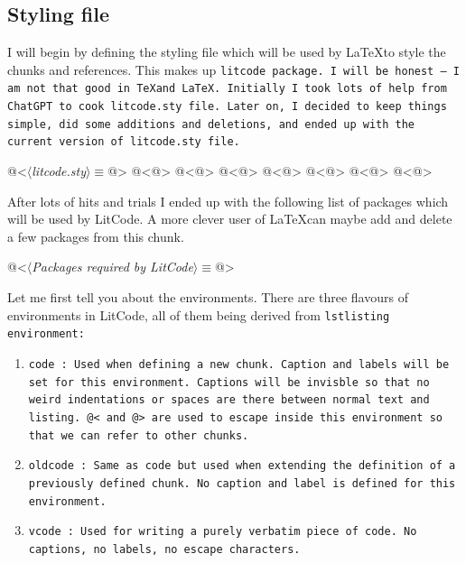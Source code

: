 \subsection{Styling file}

I will begin by defining the styling file which will be used by \LaTeX to style the chunks and references.
This makes up \tt litcode \rm package. I will be honest --- I am not that good in \TeX and \LaTeX. Initially I
took lots of help from ChatGPT to cook \tt litcode.sty \rm file. Later on, I decided to keep things simple,
did some additions and deletions, and ended up with the current version of \tt litcode.sty \rm file.

\begin{code}
@<$\langle$\textit{litcode.sty}$\rangle\equiv$@>
@<@>
@<@>
@<@>
@<@>
@<@>
@<@>
@<@>
\end{code}

After lots of hits and trials I ended up with the following list of packages which will be used by LitCode. A
more clever user of \LaTeX \thinspace can maybe add and delete a few packages from this chunk.

\begin{code}
@<$\langle$\textit{Packages required by LitCode}$\rangle\equiv$@>
\RequirePackage[T1]{fontenc}
\usepackage{amsmath}
\RequirePackage{textcomp}
\RequirePackage{calc}
\RequirePackage{caption}
\RequirePackage{hyperref}
\RequirePackage{cleveref}

\RequirePackage{fancyvrb}
\RequirePackage{listings}
\RequirePackage{xcolor}

\RequirePackage{xparse}
\RequirePackage{subcaption}
\end{code}

Let me first tell you about the environments. There are three flavours of environments in LitCode, all of them
being derived from \tt lstlisting \rm environment:

\begin{enumerate}
    \item \tt code \rm: Used when defining a new chunk. Caption and labels will be set for this environment.
    Captions will be invisble so that no weird indentations or spaces are there between normal text and
    listing. \verb|@<| and \verb|@>| are used to escape inside this environment so that we can refer to other
    chunks. 
    \item \tt oldcode \rm: Same as \tt code \rm but used when extending the definition of a previously defined
    chunk. No caption and label is defined for this environment. 
    \item \tt vcode \rm: Used for writing a purely verbatim piece of code. No captions, no labels, no escape characters.
\end{enumerate}

